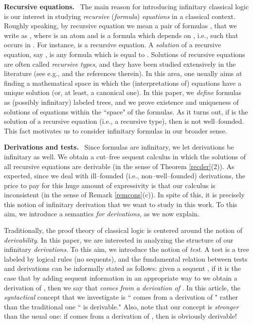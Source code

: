 \documentclass[copyright,creativecommons]{eptcs}
\def\eg{e.g., }
\def\ie{i.e., }
\theoremstyle{definition}
\begin{document}
 \vspace{-0.35cm}

 \noindent \textbf{Recursive equations.} \
 The main  reason for introducing infinitary classical logic
 is our interest in studying \emph{recursive}
 (\emph{formula}) \emph{equations} in a classical context.
 Roughly speaking, by recursive  equation we  mean  a
pair of formulas ,  that we write as  , where
 is an atom and   is a formula which depends on , \ie such that  occurs in . For instance,
 is a recursive equation.
  A \emph{solution} of a recursive equation, say ,
 is any formula  which is equal   to .
  Solutions of recursive equations are often called
 \emph{recursive types},
 and they have been studied extensively  in the literature
 (see \eg \cite{coppo,MelVou} and the references therein).
In this area,  one usually aims at finding a   mathematical space  in which the (interpretations of) equations
have a unique solution (or, at least, a canonical one).
In this paper,
we \emph{define} formulas as (possibly infinitary) labeled trees,
and we prove  existence and uniqueness of  solutions of equations
within the ``space" of the formulas.
As it turns out, if  is the solution of a recursive equation (\ie a recursive type), then 
is not  well--founded. This
fact motivates us to consider  infinitary formulas in our broader sense. \\
\vspace{-0.35cm}

 \noindent \textbf{Derivations and tests.} \
 Since formulas are infinitary, we  let derivations  be infinitary as well.
We obtain a cut--free sequent
calculus in which the
solutions of all recursive equations
are derivable (in the sense of Theorem \ref{recder}(2)).  As expected, since we deal with
ill--founded (\ie non--well--founded) derivations,
 the price to pay for this huge amount of expressivity is that our calculus
is inconsistent (in the  sense of Remark \ref{remcons}(c)).
In spite of this,  it is precisely
this notion of infinitary  derivation that we want
to study in this work.  To this aim, we introduce a semantics \emph{for derivations},  as we now explain.

Traditionally, the proof theory of classical logic is centered around the notion of  \emph{derivability}.
In this paper, we are interested in analyzing
the structure of  our infinitary \emph{derivations}. To this aim, we introduce the notion of \emph{test}.  A {test}  is a
 tree labeled by logical rules
(no sequents), and the fundamental relation between tests and derivations can be informally stated as follows: given a sequent ,
 if it is the case that by adding sequent information in an appropriate way to   we obtain  a  derivation of  , then
 we say that
  \emph{ comes from a derivation
of   \/}.
In this article,  the  \emph{syntactical} concept that we  investigate is `` comes from a derivation
of \/"  rather than the traditional one `` is derivable."
Also, note that our concept is \emph{stronger} than the usual  one:
 if  comes from a derivation of , then  is obviously derivable!
\end{document}
